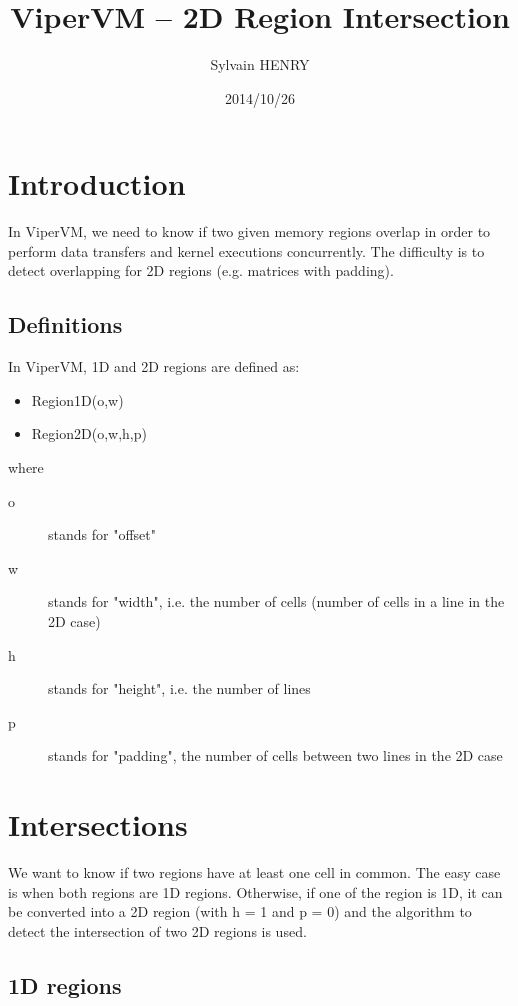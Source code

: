 \documentclass[twocolumn]{article}
\begin{document}
\title{ViperVM -- 2D Region Intersection}
\author{Sylvain HENRY}
\date{2014/10/26}


\maketitle

\section{Introduction}

In ViperVM, we need to know if two given memory regions overlap in order to
perform data transfers and kernel executions concurrently. The difficulty is to
detect overlapping for 2D regions (e.g. matrices with padding).

\subsection{Definitions}

In ViperVM, 1D and 2D regions are defined as:
\begin{itemize}
   \item Region1D(o,w)
   \item Region2D(o,w,h,p)
\end{itemize}
where
\begin{description}
   \item[o] stands for "offset"
   \item[w] stands for "width", i.e. the number of cells (number of cells in a line in the 2D case)
   \item[h] stands for "height", i.e. the number of lines
   \item[p] stands for "padding", the number of cells between two lines in the 2D
   case
\end{description}

\section{Intersections}

We want to know if two regions have at least one cell in common. The easy case
is when both regions are 1D regions. Otherwise, if one of the region is 1D, it
can be converted into a 2D region (with h = 1 and p = 0) and the algorithm to
detect the intersection of two 2D regions is used.

\subsection{1D regions}
\end{document}
